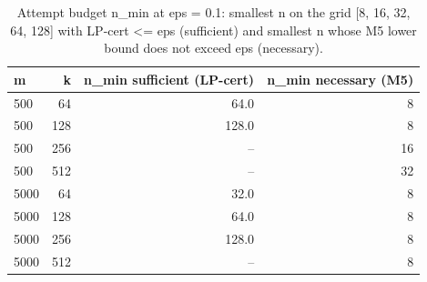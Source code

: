 \begin{table}[t]
\centering
\small
\begin{tabular}{lrrr}
\toprule
m & k & n\_min sufficient (LP-cert) & n\_min necessary (M5) \\
\midrule
500 & 64 & 64.0 & 8 \\
500 & 128 & 128.0 & 8 \\
500 & 256 & -- & 16 \\
500 & 512 & -- & 32 \\
5000 & 64 & 32.0 & 8 \\
5000 & 128 & 64.0 & 8 \\
5000 & 256 & 128.0 & 8 \\
5000 & 512 & -- & 8 \\
\bottomrule
\end{tabular}
\caption{Attempt budget n\_min at eps = 0.1: smallest n on the grid [8, 16, 32, 64, 128] with LP-cert <= eps (sufficient) and smallest n whose M5 lower bound does not exceed eps (necessary).}
\label{tab:T5b_attempt_budget}
\end{table}
